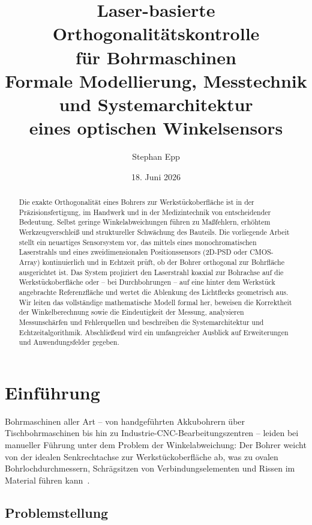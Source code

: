 ﻿\documentclass[a4paper,12pt]{article}
\title{\textbf{Laser-basierte Orthogonalitätskontrolle\\für Bohrmaschinen}\\[0.5em]
\large Formale Modellierung, Messtechnik und Systemarchitektur\\
eines optischen Winkelsensors}
\author{Stephan Epp}
\date{18. Juni 2026}
\theoremstyle{definition}
\begin{document}
\maketitle

\begin{abstract}
Die exakte Orthogonalität eines Bohrers zur Werkstückoberfläche ist in der Präzisionsfertigung,
im Handwerk und in der Medizintechnik von entscheidender Bedeutung. Selbst geringe Winkelabweichungen
führen zu Maßfehlern, erhöhtem Werkzeugverschleiß und struktureller Schwächung des Bauteils.
Die vorliegende Arbeit stellt ein neuartiges Sensorsystem vor, das mittels eines monochromatischen
Laserstrahls und eines zweidimensionalen Positionssensors (2D-PSD oder CMOS-Array) kontinuierlich
und in Echtzeit prüft, ob der Bohrer orthogonal zur Bohrfläche ausgerichtet ist.
Das System projiziert den Laserstrahl koaxial zur Bohrachse auf die Werkstückoberfläche oder --
bei Durchbohrungen -- auf eine hinter dem Werkstück angebrachte Referenzfläche und wertet die
Ablenkung des Lichtflecks geometrisch aus.
Wir leiten das vollständige mathematische Modell formal her, beweisen die Korrektheit
der Winkelberechnung sowie die Eindeutigkeit der Messung, analysieren Messunschärfen
und Fehlerquellen und beschreiben die Systemarchitektur und Echtzeitalgorithmik.
Abschließend wird ein umfangreicher Ausblick auf Erweiterungen und Anwendungsfelder gegeben.
\end{abstract}

\tableofcontents
\newpage

\section{Einführung}

Bohrmaschinen aller Art -- von handgeführten Akkubohrern über Tischbohrmaschinen bis hin zu
Industrie-CNC-Bearbeitungszentren -- leiden bei manueller Führung unter dem Problem der
Winkelabweichung: Der Bohrer weicht von der idealen Senkrechtachse zur Werkstückoberfläche ab,
was zu ovalen Bohrlochdurchmessern, Schrägsitzen von Verbindungselementen und Rissen im Material
führen kann~\cite{klocke2018fertigungsverfahren, toennis2020messtechnik}.

\subsection{Problemstellung}
\end{document}

